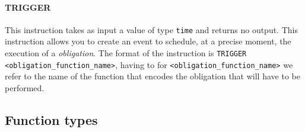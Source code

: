 \paragraph{TRIGGER}

This instruction takes as input a value of type \verb|time| and returns no output. This instruction allows 
you to create an event to schedule, at a precise moment, the execution of a \textit{obligation}. The 
format of the instruction is \verb|TRIGGER <obligation_function_name>|, having to for 
\verb|<obligation_function_name>| we refer to the name of the function that encodes the obligation that 
will have to be performed.

\subsection{Function types}

